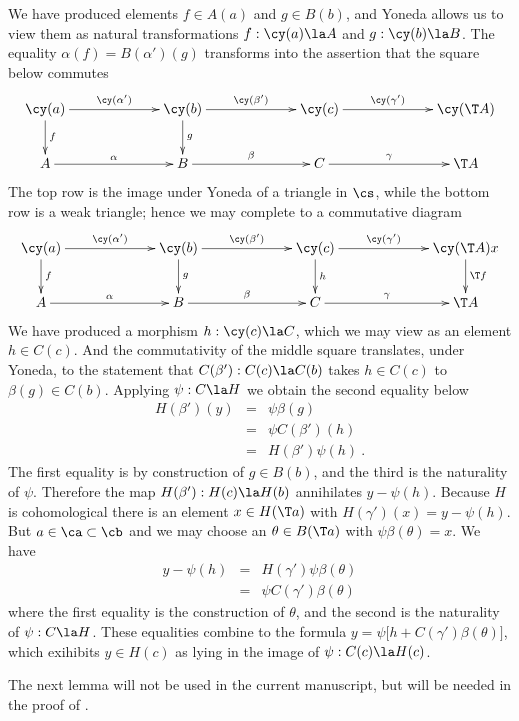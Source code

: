 \documentclass[11pt]{amsart}
\begin{document}
We have produced elements $f\in A(a)$ and $g\in B(b)$, and
Yoneda allows us to view them as
natural transformations $f:\cy(a)\la A$ and $g:\cy(b)\la B$.
The equality $\alpha(f)=B(\alpha')(g)$ transforms into the assertion that
the square below commutes
\[\xymatrix@C+40pt{
  \cy(a)\ar[r]^-{\cy(\alpha')}\ar[d]^f & \cy(b)\ar[r]^-{\cy(\beta')} \ar[d]^g & \cy(c)\ar[r]^-{\cy(\gamma')} & \cy(\T A) \\
  A\ar[r]^-{\alpha} & B\ar[r]^-{\beta}&  C \ar[r]^-\gamma & \T A 
}\]
The top row is the image under Yoneda of a triangle in $\cs$,
while the bottom row is a
weak triangle; hence we may complete to a commutative diagram
\[\xymatrix@C+40pt{
  \cy(a)\ar[r]^-{\cy(\alpha')}\ar[d]^f & \cy(b)\ar[r]^-{\cy(\beta')} \ar[d]^g & \cy(c)\ar[r]^-{\cy(\gamma')}\ar[d]^h & \cy(\T A)\ar[d]^{\T f}x \\
  A\ar[r]^-{\alpha} & B\ar[r]^-{\beta}&  C \ar[r]^-\gamma & \T A 
}\]
We have produced a morphism $h:\cy(c)\la C$, which we may view as an
element $h\in C(c)$. And the commutativity of the
middle square translates, under Yoneda, to the statement that
$C(\beta'):C(c)\la C(b)$ takes $h\in C(c)$ to $\beta(g)\in C(b)$.
Applying
$\psi:C\la H$ we obtain the second equality below
\begin{eqnarray*}
  H(\beta')(y) &=& \psi\beta(g)\\
  &=&\psi C(\beta')(h) \\
  &=&H(\beta')\psi(h)\ .
\end{eqnarray*}
The first equality is by construction of $g\in B(b)$,
and the third is
the naturality of $\psi$. Therefore the map
$H(\beta'):H(c)\la H(b)$ annihilates
$y-\psi(h)$. Because $H$ is cohomological there is
an element $x\in H(\T a)$ with $H(\gamma')(x)=y-\psi(h)$.
But $a\in\ca\subset\cb$ and we may choose
an $\theta\in B(\T a)$ with $\psi\beta(\theta)=x$. We
have
\begin{eqnarray*}
  y-\psi(h)
  &=& H(\gamma')\psi\beta(\theta)\\
  &=&\psi C(\gamma')\beta(\theta)
\end{eqnarray*}
where the first equality is the construction of $\theta$,
and the second is
the naturality of $\psi:C\la H$.
These equalities combine to the formula
$y=\psi\big[h+C(\gamma')\beta(\theta)\big]$, which
exihibits $y\in H(c)$ as lying in the image
of $\psi:C(c)\la H(c)$.
\eprf

The next lemma will not be used in the current manuscript, but will be
needed in the proof of \cite[Theorem~4.6]{Neeman18}.
\end{document}
